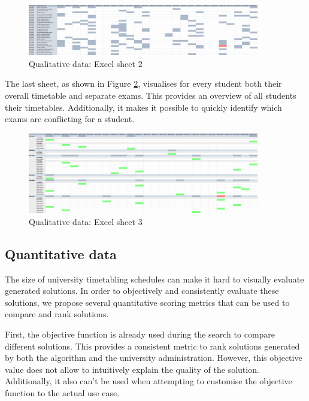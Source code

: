 \begin{figure}[H]
	\centering
	\includegraphics[width=0.9\textwidth]{images/excel/excel_sheet2.png} 
	\caption{Qualitative data: Excel sheet 2}
	\label{fig:sheet2}
\end{figure}

The last sheet, as shown in Figure \ref{fig:sheet3}, visualises for every student both their overall timetable and separate exams. This provides an overview of all students their timetables. Additionally, it makes it possible to quickly identify which exams are conflicting for a student.

\begin{figure}[H]
	\centering
	\includegraphics[width=0.9\textwidth]{images/excel/excel_sheet3.png} 
	\caption{Qualitative data: Excel sheet 3}
	\label{fig:sheet3}
\end{figure}

\subsection{Quantitative data} \label{quantitative}

The size of university timetabling schedules can make it hard to visually evaluate generated solutions. In order to objectively and consistently evaluate these solutions, we propose several quantitative scoring metrics that can be used to compare and rank solutions.

First, the objective function is already used during the search to compare different solutions. This provides a  consistent metric to rank  solutions generated by both the algorithm and the university administration. However, this objective value does not allow to intuitively explain the quality of the solution. Additionally, it also can't be used when attempting to customise the objective function to the actual use case.

